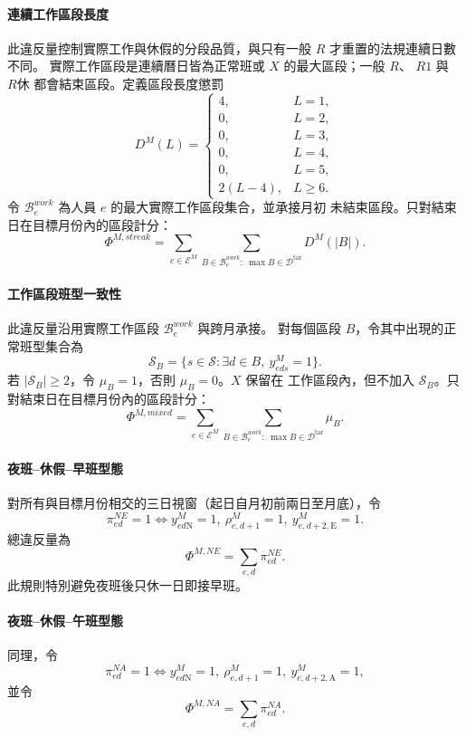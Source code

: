 \documentclass[a4paper,12pt]{article}
\begin{document}
\paragraph{連續工作區段長度}
此違反量控制實際工作與休假的分段品質，與只有一般 \(R\) 才重置的法規連續日數不同。
實際工作區段是連續曆日皆為正常班或 \(X\) 的最大區段；一般 \(R\)、
\(R1\) 與 \(R休\) 都會結束區段。定義區段長度懲罰
\[
  D^M(L)
  =
  \begin{cases}
    4, & L=1,\\
    0, & L=2,\\
    0, & L=3,\\
    0, & L=4,\\
    0, & L=5,\\
    2(L-4), & L\geq6.
  \end{cases}
\]
令 \(\mathcal{B}^{work}_e\) 為人員 \(e\) 的最大實際工作區段集合，並承接月初
未結束區段。只對結束日在目標月份內的區段計分：
\[
  \Phi^{M,streak}
  =
  \sum_{e\in\mathcal{E}^{M}}
  \sum_{B\in\mathcal{B}^{work}_e:\ \max B\in\mathcal{D}^{\mathrm{tar}}}
  D^M(|B|).
\]

\paragraph{工作區段班型一致性}
此違反量沿用實際工作區段 \(\mathcal{B}^{work}_e\) 與跨月承接。
對每個區段 \(B\)，令其中出現的正常班型集合為
\[
  \mathcal S_B
  =\{s\in\mathcal S:\exists d\in B,\ y^M_{eds}=1\}.
\]
若 \(|\mathcal S_B|\geq2\)，令 \(\mu_B=1\)，否則 \(\mu_B=0\)。\(X\) 保留在
工作區段內，但不加入 \(\mathcal S_B\)。只對結束日在目標月份內的區段計分：
\[
  \Phi^{M,mixed}
  =\sum_{e\in\mathcal E^M}
  \sum_{B\in\mathcal B^{work}_e:\ \max B\in\mathcal D^{\mathrm{tar}}}\mu_B.
\]

\paragraph{夜班--休假--早班型態}
對所有與目標月份相交的三日視窗（起日自月初前兩日至月底），令
\[
  \pi^{NE}_{ed}=1
  \Longleftrightarrow
  y^{M}_{ed\mathrm{N}}=1,
  \ \rho^{M}_{e,d+1}=1,
  \ y^{M}_{e,d+2,\mathrm{E}}=1.
\]
總違反量為
\[
  \Phi^{M,NE}=\sum_{e,d}\pi^{NE}_{ed}.
\]
此規則特別避免夜班後只休一日即接早班。

\paragraph{夜班--休假--午班型態}
同理，令
\[
  \pi^{NA}_{ed}=1
  \Longleftrightarrow
  y^{M}_{ed\mathrm{N}}=1,
  \ \rho^{M}_{e,d+1}=1,
  \ y^{M}_{e,d+2,\mathrm{A}}=1,
\]
並令
\[
  \Phi^{M,NA}=\sum_{e,d}\pi^{NA}_{ed}.
\]
\end{document}
